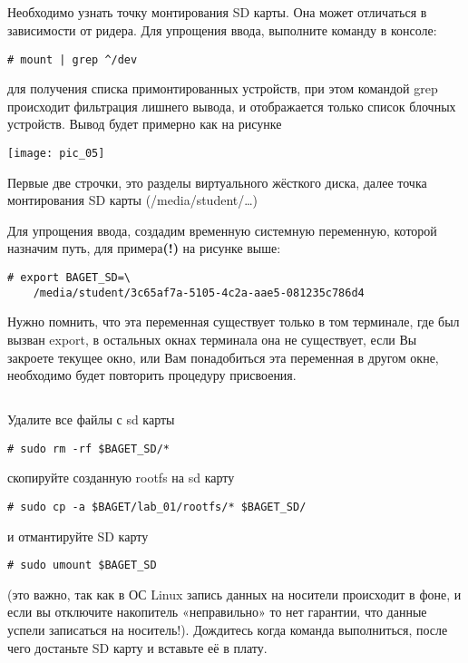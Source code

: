 \subsection{}Необходимо узнать точку монтирования SD карты. Она может отличаться в зависимости от ридера. Для упрощения ввода, выполните команду в консоле:
\begin{lstlisting}[style=bash]
	# mount | grep ^/dev
\end{lstlisting}
для получения списка примонтированных устройств, при этом командой grep происходит фильтрация лишнего вывода, и отображается только список блочных устройств. Вывод будет примерно как на рисунке

\begin{center}
	\texttt{[image: pic\_05]}
\end{center}

Первые две строчки, это разделы виртуального жёсткого диска, далее точка монтирования SD карты (/media/student/…)

Для упрощения ввода, создадим временную системную переменную, которой назначим путь, для примера\textbf{(!)} на рисунке выше:
\begin{lstlisting}[style=bash]
	# export BAGET_SD=\
	/media/student/3c65af7a-5105-4c2a-aae5-081235c786d4
\end{lstlisting}

Нужно помнить, что эта переменная существует только в том терминале, где был вызван export, в остальных окнах терминала она не существует, если Вы закроете текущее окно, или Вам понадобиться эта переменная в другом окне, необходимо будет повторить процедуру присвоения.

\subsection{}Удалите все файлы с sd карты
\begin{lstlisting}[style=bash]
	# sudo rm -rf $BAGET_SD/*
\end{lstlisting}
скопируйте созданную rootfs на sd карту
\begin{lstlisting}[style=bash]
	# sudo cp -a $BAGET/lab_01/rootfs/* $BAGET_SD/
\end{lstlisting}
и отмантируйте SD карту 
\begin{lstlisting}[style=bash]
	# sudo umount $BAGET_SD
\end{lstlisting}
(это важно, так как в ОС Linux запись данных на носители происходит в фоне, и если вы отключите накопитель «неправильно» то нет гарантии, что данные успели записаться на носитель!).
Дождитесь когда команда выполниться, после чего достаньте SD карту и вставьте её в плату.

